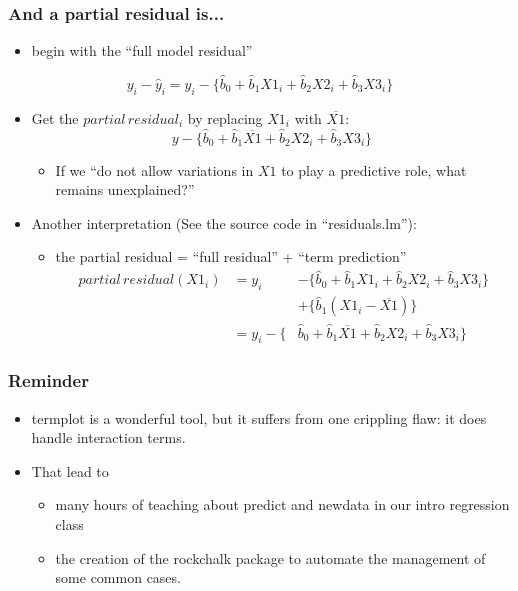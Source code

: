 \documentclass[10pt,english]{beamer}
\begin{document}
\begin{frame}
\frametitle{And a partial residual is...}
\begin{itemize}
\item begin with the ``full model residual''
\end{itemize}
\begin{equation}
y_{i}-\hat{y}_{i}=y_{i}-\{\hat{b}_{0}+\hat{b}_{1}X1_{i}+\hat{b}_{2}X2_{i}+\hat{b}_{3}X3_{i}\}
\end{equation}

\begin{itemize}
\item Get the \textrm{$partial\, residual_{i}$} by replacing $X1_{i}$
with $\overline{X1}$: \textrm{
\begin{equation}
y-\{\hat{b}_{0}+\hat{b}_{1}\overline{X1}+\hat{b}_{2}X2_{i}+\hat{b}_{3}X3_{i}\}
\end{equation}
}

\begin{itemize}
\item If we ``do not allow variations in $X1$ to play a predictive role,
what remains unexplained?''
\end{itemize}
\item Another interpretation (See the source code in ``residuals.lm''):

\begin{itemize}
\item the partial residual = ``full residual'' + ``term prediction''
\begin{eqnarray*}
partial\, residual(X1_{i}) & =y_{i} & -\{\hat{b}_{0}+\hat{b}_{1}X1_{i}+\hat{b}_{2}X2_{i}+\hat{b}_{3}X3_{i}\}\\
 &  & +\{\hat{b}_{1}(X1_{i}-\overline{X1})\}\\
 & =y_{i}-\{ & \hat{b}_{0}+\hat{b}_{1}\overline{X1}+\hat{b}_{2}X2_{i}+\hat{b}_{3}X3_{i}\}
\end{eqnarray*}

\end{itemize}
\end{itemize}
\end{frame}

\begin{frame}
\frametitle{Reminder}
\begin{itemize}
\item termplot is a wonderful tool, but it suffers from one crippling flaw:
it does handle interaction terms.
\item That lead to

\begin{itemize}
\item many hours of teaching about predict and newdata in our intro regression
class
\item the creation of the rockchalk package to automate the management of
some common cases.
\end{itemize}
\end{itemize}
\end{frame}
\end{document}
